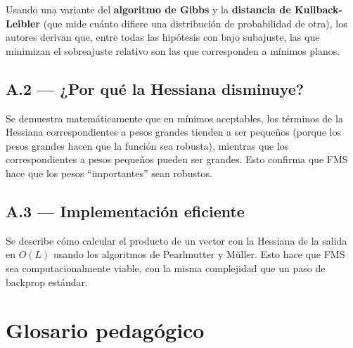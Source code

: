 \documentclass[11pt,a4paper]{article}
\begin{document}
Usando una variante del \textbf{algoritmo de Gibbs} y la \textbf{distancia de Kullback-Leibler} (que mide cuánto difiere una distribución de probabilidad de otra), los autores derivan que, entre todas las hipótesis con bajo subajuste, las que minimizan el sobreajuste relativo son las que corresponden a mínimos planos.

\subsection{A.2 — ¿Por qué la Hessiana disminuye?}

Se demuestra matemáticamente que en mínimos aceptables, los términos de la Hessiana correspondientes a pesos grandes tienden a ser pequeños (porque los pesos grandes hacen que la función sea robusta), mientras que los correspondientes a pesos pequeños pueden ser grandes. Esto confirma que FMS hace que los pesos ``importantes'' sean robustos.

\subsection{A.3 — Implementación eficiente}

Se describe cómo calcular el producto de un vector con la Hessiana de la salida en $O(L)$ usando los algoritmos de Pearlmutter y Müller. Esto hace que FMS sea computacionalmente viable, con la misma complejidad que un paso de backprop estándar.

\section{Glosario pedagógico}
\label{sec:glosario}
\end{document}
